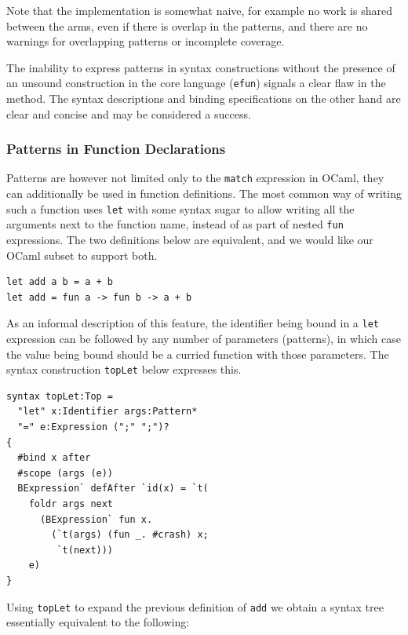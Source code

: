 \documentclass{kththesis}
\begin{document}
Note that the implementation is somewhat naive, for example no work is shared between the arms, even if there is overlap in the patterns, and there are no warnings for overlapping patterns or incomplete coverage.

The inability to express patterns in syntax constructions without the presence of an unsound construction in the core language (\texttt{efun}) signals a clear flaw in the method. The syntax descriptions and binding specifications on the other hand are clear and concise and may be considered a success.

\subsubsection{Patterns in Function Declarations}
\label{sec:ocaml-function-argument-patterns}

Patterns are however not limited only to the \texttt{match} expression in OCaml, they can additionally be used in function definitions. The most common way of writing such a function uses \texttt{let} with some syntax sugar to allow writing all the arguments next to the function name, instead of as part of nested \texttt{fun} expressions. The two definitions below are equivalent, and we would like our OCaml subset to support both.

\begin{verbatim}
let add a b = a + b
let add = fun a -> fun b -> a + b
\end{verbatim}

As an informal description of this feature, the identifier being bound in a \texttt{let} expression can be followed by any number of parameters (patterns), in which case the value being bound should be a curried function with those parameters. The syntax construction \texttt{topLet} below expresses this.

\begin{verbatim}
syntax topLet:Top =
  "let" x:Identifier args:Pattern*
  "=" e:Expression (";" ";")?
{
  #bind x after
  #scope (args (e))
  BExpression` defAfter `id(x) = `t(
    foldr args next
      (BExpression` fun x.
        (`t(args) (fun _. #crash) x;
         `t(next)))
    e)
}
\end{verbatim}

Using \texttt{topLet} to expand the previous definition of \texttt{add} we obtain a syntax tree essentially equivalent to the following:
\end{document}
